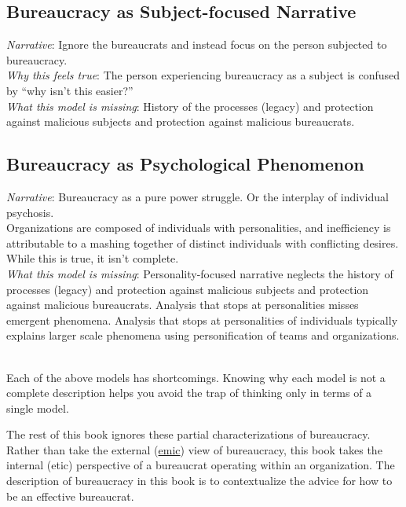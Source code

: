 \subsection{Bureaucracy as Subject-focused Narrative}
\textit{Narrative}: Ignore the bureaucrats and instead focus on the person subjected to bureaucracy. \\
\textit{Why this feels true}: The person experiencing bureaucracy as a subject is confused by ``why isn't this easier?''  \\
\textit{What this model is missing}: History of the processes (legacy) and protection against malicious subjects and protection against malicious bureaucrats. 


\subsection{Bureaucracy as Psychological Phenomenon}

\textit{Narrative}: Bureaucracy as a pure power struggle. Or the interplay of individual psychosis. \\



Organizations are composed of individuals with personalities, and inefficiency is attributable to a mashing together of distinct individuals with conflicting desires.
While this is true, it isn't complete. \\
\textit{What this model is missing}: Personality-focused narrative neglects the history of processes (legacy) and protection against malicious subjects and protection against malicious bureaucrats. Analysis that stops at personalities misses emergent phenomena. Analysis that stops at personalities of individuals typically explains larger scale phenomena using personification of teams and organizations. 

\ \\

Each of the above models has shortcomings. Knowing why each model is not a complete description helps you avoid the trap of thinking only in terms of a single model. 

The rest of this book ignores these partial characterizations of bureaucracy. 
Rather than take the external (\href{https://en.wikipedia.org/wiki/Emic_and_etic}{emic}) view of bureaucracy, this book takes the internal (etic) perspective of a bureaucrat operating within an organization. 
The description of bureaucracy in this book is to contextualize the advice for how to be an effective bureaucrat. 